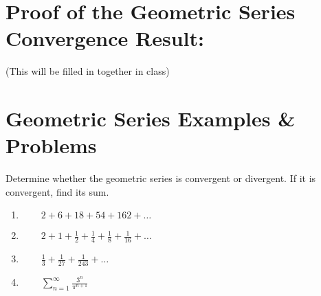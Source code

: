 \documentclass[10pt]{article}
\begin{document}
\section*{Proof of the Geometric Series Convergence Result:}
(This will be filled in together in class)

\pagebreak

\section*{Geometric Series Examples \& Problems}


Determine whether the geometric series is convergent or divergent. If it is convergent, find its sum.

\begin{enumerate}

\item \(\qquad 2+6+18+54+162+\ldots\) \vfill
\item \(\qquad2+1+\frac{1}{2}+\frac{1}{4}+\frac{1}{8}+\frac{1}{16}+\ldots\) \vfill

\item \(\qquad\frac{1}{3}+\frac{1}{27}+\frac{1}{243}+\ldots\)\vfill
\item \(\qquad\sum_{n=1}^\infty	\frac{3^n}{\pi^{n+1}}\)\vfill

\end{enumerate}
%
%
%
%
\end{document}
